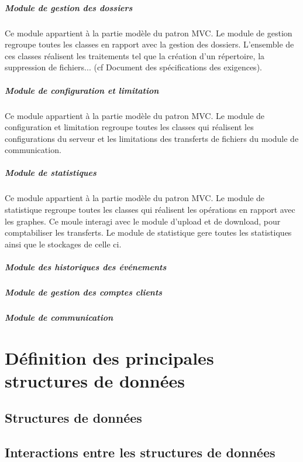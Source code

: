 \documentclass[10pt,a4paper]{report}
\begin{document}
				\subparagraph{Module de gestion des dossiers}
				\begin{flushleft}
				Ce module appartient à la partie modèle du patron MVC. Le module de gestion regroupe  toutes les classes en rapport avec la gestion des dossiers. L'ensemble de ces classes réalisent les traitements tel que la création d'un répertoire, la suppression de fichiers... (cf Document des spécifications des exigences).\\ 
				\end{flushleft}
	
				\subparagraph{Module de configuration et limitation}	
				\begin{flushleft}
				Ce module appartient à la partie modèle du patron MVC. Le module de configuration et limitation regroupe toutes les classes qui réalisent les configurations du serveur et les limitations des transferts de fichiers du module de communication.
				\end{flushleft}
	
				\subparagraph{Module de statistiques}
				\begin{flushleft}
				Ce module appartient à la partie modèle du patron MVC. Le module de statistique regroupe toutes les classes qui réalisent les opérations en rapport avec les graphes. Ce moule interagi avec le module d'upload et de download, pour comptabiliser les transferts. Le module de statistique gere toutes les statistiques ainsi que le stockages de celle ci.
				\end{flushleft}
				
	
				\subparagraph{Module des historiques des événements}
	
	
				\subparagraph{Module de gestion des comptes clients}
	
	
				\subparagraph{Module de communication}

\section{Définition des principales structures de données}

	\subsection{Structures de données}

	\subsection{Interactions entre les structures de données} %
\end{document}
